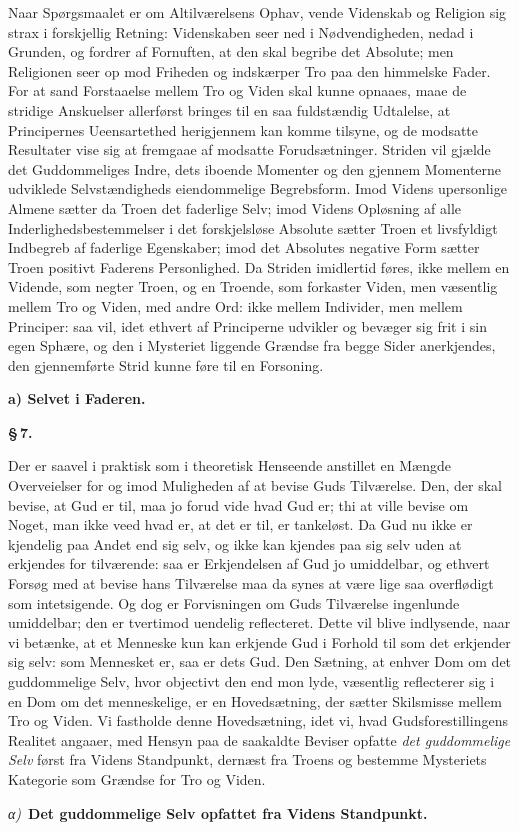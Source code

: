 \documentclass[12pt]{book}
\newcommand{\parmark}[1]{\begin{center}{\bfseries \S\,#1.}\end{center}}
\newcommand{\runhead}[1]{%
  \medskip\begin{center}{\bfseries #1}\end{center}\medskip}
\newcommand{\greekrun}[2]{%
  \medskip\begin{center}{\itshape #1)}\ {\bfseries #2}\end{center}\medskip}
\begin{document}
Naar Spørgsmaalet er om Altilværelsens Ophav, vende Videnskab og
Religion sig strax i forskjellig Retning: Videnskaben seer ned i
Nødvendigheden, nedad i Grunden, og fordrer af Fornuften, at den
skal begribe det Absolute; men Religionen seer op mod Friheden og
indskærper Tro paa den himmelske Fader. For at sand Forstaaelse
mellem Tro og Viden skal kunne opnaaes, maae de stridige Anskuelser
allerførst bringes til en saa fuldstændig Udtalelse, at Principernes
Ueensartethed herigjennem kan komme tilsyne, og de modsatte
Resultater vise sig at fremgaae af modsatte Forudsætninger. Striden
vil gjælde det Guddommeliges Indre, dets iboende Momenter og den
gjennem Momenterne udviklede Selvstændigheds eiendommelige
Begrebsform. Imod Videns upersonlige Almene sætter da Troen det
faderlige Selv; imod Videns Opløsning af alle
Inderlighedsbestemmelser i det forskjelsløse Absolute sætter Troen
et livsfyldigt Indbegreb af faderlige Egenskaber; imod det Absolutes
negative Form sætter Troen positivt Faderens Personlighed. Da
Striden imidlertid føres, ikke mellem en Vidende, som negter Troen,
og en Troende, som forkaster Viden, men
væsentlig mellem Tro og Viden, med andre Ord: ikke mellem
Individer, men mellem Principer: saa vil, idet ethvert af
Principerne udvikler og bevæger sig frit i sin egen Sphære, og den i
Mysteriet liggende Grændse fra begge Sider anerkjendes, den
gjennemførte Strid kunne føre til en Forsoning.

\runhead{a) Selvet i Faderen.}
\parmark{7}

Der er saavel i praktisk som i theoretisk Henseende anstillet en
Mængde Overveielser for og imod Muligheden af at bevise Guds
Tilværelse. Den, der skal bevise, at Gud er til, maa jo forud vide
hvad Gud er; thi at ville bevise om Noget, man ikke veed hvad er, at
det er til, er tankeløst. Da Gud nu ikke er kjendelig paa Andet end
sig selv, og ikke kan kjendes paa sig selv uden at erkjendes for
tilværende: saa er Erkjendelsen af Gud jo umiddelbar, og ethvert
Forsøg med at bevise hans Tilværelse maa da synes at være lige saa
overflødigt som intetsigende. Og dog er Forvisningen om Guds
Tilværelse ingenlunde umiddelbar; den er tvertimod uendelig
reflecteret. Dette vil blive indlysende, naar vi betænke, at et
Menneske kun kan erkjende Gud i Forhold til som det erkjender sig
selv: som Mennesket er, saa er dets Gud. Den Sætning, at enhver Dom
om det guddommelige Selv, hvor objectivt den end mon lyde, væsentlig
reflecterer sig i en Dom om det menneskelige, er en Hovedsætning,
der sætter Skilsmisse mellem Tro og Viden. Vi fastholde denne
Hovedsætning, idet vi, hvad Gudsforestillingens Realitet angaaer,
med Hensyn paa de saakaldte Beviser opfatte \emph{det guddommelige
Selv} først fra Videns Standpunkt, dernæst fra Troens og bestemme
Mysteriets Kategorie som Grændse for Tro og Viden.
\greekrun{α}{Det guddommelige Selv opfattet fra Videns Standpunkt.}
\end{document}
